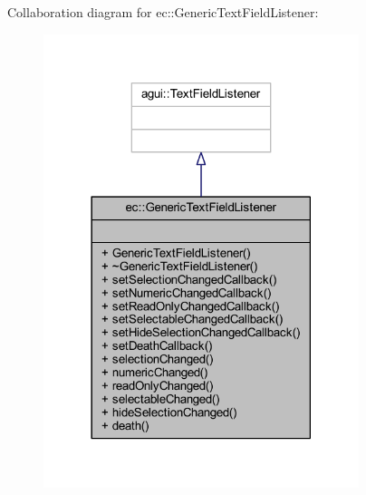 Collaboration diagram for ec\+:\+:Generic\+Text\+Field\+Listener\+:\nopagebreak
\begin{figure}[H]
\begin{center}
\leavevmode
\includegraphics[width=261pt]{classec_1_1_generic_text_field_listener__coll__graph}
\end{center}
\end{figure}
